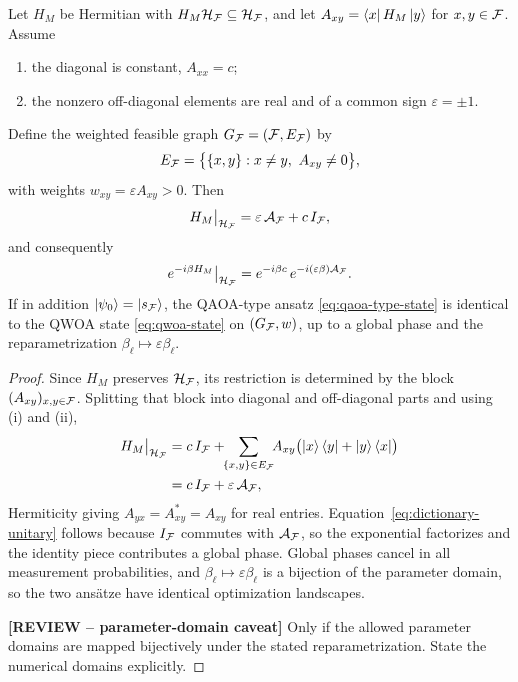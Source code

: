 \begin{lemma}
\label{lem:dictionary}
Let $H_M$ be Hermitian with $H_M\mathcal{H}_{\mathcal{F}}\subseteq\mathcal{H}_{\mathcal{F}}$, and let $A_{xy}=\bra{x}H_M\ket{y}$ for $x,y\in\mathcal{F}$. Assume
\begin{enumerate}
    \item[(i)] the diagonal is constant, $A_{xx}=c$;
    \item[(ii)] the nonzero off-diagonal elements are real and of a common sign
$\varepsilon=\pm1$.
\end{enumerate}
Define the weighted feasible graph $G_{\mathcal{F}}=(\mathcal{F},E_{\mathcal{F}})$ by
\begin{equation}
    E_{\mathcal{F}}=\bigl\{\{x,y\}:x\neq y,\ A_{xy}\neq 0\bigr\},
    \label{eq:dictionary-graph}
\end{equation}
with weights $w_{xy}=\varepsilon A_{xy}>0$. Then
\begin{equation}
    H_M\big|_{\mathcal{H}_{\mathcal{F}}}
    =
    \varepsilon\,\mathcal{A}_{\mathcal{F}}+c\,I_{\mathcal{F}},
    \label{eq:dictionary-operator}
\end{equation}
and consequently
\begin{equation}
    e^{-i\beta H_M}\big|_{\mathcal{H}_{\mathcal{F}}}
    =
    e^{-i\beta c}\,
    e^{-i(\varepsilon\beta)\mathcal{A}_{\mathcal{F}}} .
    \label{eq:dictionary-unitary}
\end{equation}
If in addition $\ket{\psi_0}=\ket{s_{\mathcal{F}}}$, the QAOA-type ansatz \eqref{eq:qaoa-type-state} is identical to the QWOA state \eqref{eq:qwoa-state} on $(G_{\mathcal{F}},w)$, up to a global phase and the reparametrization $\beta_\ell\mapsto\varepsilon\beta_\ell$.
\end{lemma}

\begin{proof}
Since $H_M$ preserves $\mathcal{H}_{\mathcal{F}}$, its restriction is determined by the block $(A_{xy})_{x,y\in\mathcal{F}}$. Splitting that block into diagonal and off-diagonal parts and using (i) and (ii),
\begin{align}
    H_M\big|_{\mathcal{H}_{\mathcal{F}}}
    &=
    c\,I_{\mathcal{F}}
    +
    \!\!\sum_{\{x,y\}\in E_{\mathcal{F}}}\!\!
    A_{xy}\bigl(\ket{x}\bra{y}+\ket{y}\bra{x}\bigr)
    \nonumber\\
    &=
    c\,I_{\mathcal{F}}+\varepsilon\,\mathcal{A}_{\mathcal{F}},
\end{align}
Hermiticity giving $A_{yx}=A_{xy}^{*}=A_{xy}$ for real entries. Equation~\eqref{eq:dictionary-unitary} follows because $I_{\mathcal{F}}$ commutes with $\mathcal{A}_{\mathcal{F}}$, so the exponential factorizes and the identity piece contributes a global phase. Global phases cancel in all measurement probabilities, and $\beta_\ell\mapsto\varepsilon\beta_\ell$ is a bijection of the parameter domain, so the two ans\"atze have identical optimization landscapes.

{\color{red}\textbf{[REVIEW -- parameter-domain caveat]} Only if the allowed parameter domains are mapped bijectively under the stated reparametrization. State the numerical domains explicitly.}
\end{proof}

